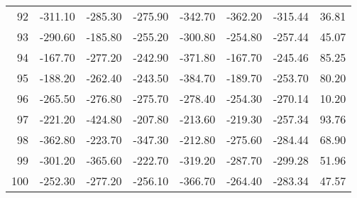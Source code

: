 \begin{longtable}{rrrrrrrr}
92 & -311.10 & -285.30 & -275.90 & -342.70 & -362.20 & -315.44 & 36.81  \\
93 & -290.60 & -185.80 & -255.20 & -300.80 & -254.80 & -257.44 & 45.07  \\
94 & -167.70 & -277.20 & -242.90 & -371.80 & -167.70 & -245.46 & 85.25  \\
95 & -188.20 & -262.40 & -243.50 & -384.70 & -189.70 & -253.70 & 80.20  \\
96 & -265.50 & -276.80 & -275.70 & -278.40 & -254.30 & -270.14 & 10.20  \\
97 & -221.20 & -424.80 & -207.80 & -213.60 & -219.30 & -257.34 & 93.76  \\
98 & -362.80 & -223.70 & -347.30 & -212.80 & -275.60 & -284.44 & 68.90  \\
99 & -301.20 & -365.60 & -222.70 & -319.20 & -287.70 & -299.28 & 51.96  \\
100 & -252.30 & -277.20 & -256.10 & -366.70 & -264.40 & -283.34 & 47.57  \\

\end{longtable}


